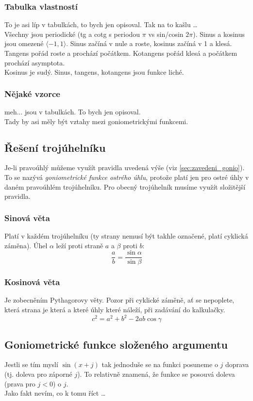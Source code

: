 \documentclass[12pt]{article}
\begin{document}
\subsubsection{Tabulka vlastností}
To je asi líp v tabulkách, to bych jen opisoval. Tak na to kašlu \dots \\
Všechny jsou periodické (tg a cotg s periodou $\pi$ vs sin/cosin $2\pi$). Sinus a kosinus jsou omezené $\langle -1, 1 \rangle$. Sinus začíná v nule a roste, kosinus začíná v 1 a klesá. Tangens pořád roste a prochází počátkem. Kotangens pořád klesá a počátkem prochází asymptota.\\
Kosinus je sudý. Sinus, tangens, kotangens jsou funkce liché.
\subsubsection{Nějaké vzorce}
meh... jsou v tabulkách. To bych jen opisoval.\\
Tady by asi měly být vztahy mezi goniometrickými funkcemi.
\subsection{Řešení trojúhelníku}
Je-li pravoúhlý můžeme využít pravidla uvedená výše (viz \ref{sec:zavedeni_gonio}). To se nazývá \emph{goniometrické funkce ostrého úhlu}, protože platí jen pro ostré úhly v daném pravoúhlém trojúhelníku. Pro obecný trojúhelník musíme využít složitější pravidla.
\subsubsection{Sinová věta}
Platí v každém trojúhelníku (ty strany nemusí být takhle označené, platí cyklická záměna). Úhel $\alpha$ leží proti straně $a$ a $\beta$ proti $b$:
\begin{equation}
\frac{a}{b} = \frac{\sin \alpha}{\sin \beta}
\end{equation}
\subsubsection{Kosinová věta}
Je zobecněním Pythagorovy věty. Pozor při cyklické záměně, ať se nepoplete, která strana je která a které úhly které náleží, při zadávání do kalkulačky.
\begin{equation}
c^2 = a^2 + b^2 - 2ab\cos\gamma
\end{equation}
\subsection{Goniometrické funkce složeného argumentu}
Jestli se tím myslí $\sin (x + j)$ tak jednoduše se na funkci posuneme o $j$ doprava (tj. doleva pro záporné $j$). To relativně znamená, že funkce se posouvá doleva (prava pro $j<0$) o $j$.\\
Jako fakt nevím, co k tomu říct \dots
\end{document}
